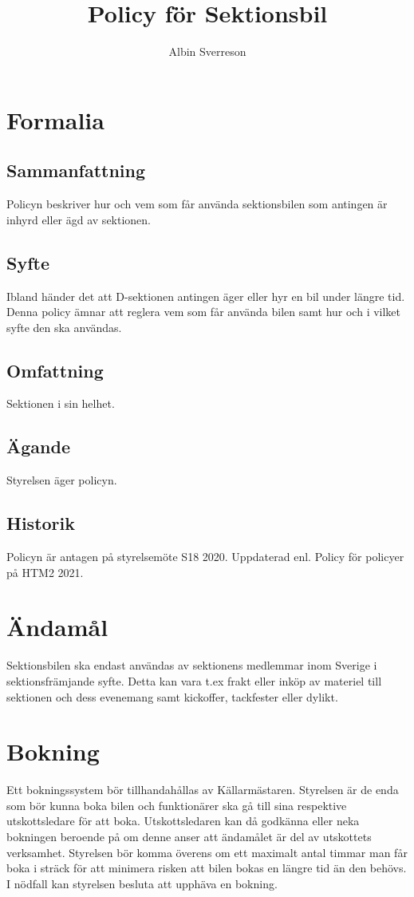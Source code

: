 \documentclass{dsekprotokoll}
\author{Albin Sverreson}
\title{Policy för Sektionsbil}
\begin{document}
\maketitle
\section{Formalia}
\subsection{Sammanfattning}
Policyn beskriver hur och vem som får använda sektionsbilen som antingen är inhyrd eller ägd av sektionen.
\subsection{Syfte}
Ibland händer det att D-sektionen antingen äger eller hyr en bil under längre tid. Denna policy ämnar att reglera vem som får använda bilen samt hur och i vilket syfte den ska användas.
\subsection{Omfattning}
Sektionen i sin helhet.
\subsection{Ägande}
Styrelsen äger policyn.
\subsection{Historik}
Policyn är antagen på styrelsemöte S18 2020.
Uppdaterad enl. Policy för policyer på HTM2 2021.


\section{Ändamål}
Sektionsbilen ska endast användas av sektionens medlemmar inom Sverige i sektionsfrämjande syfte. Detta kan vara t.ex frakt eller inköp av materiel till sektionen och dess evenemang samt kickoffer, tackfester eller dylikt.
\section{Bokning}
Ett bokningssystem bör tillhandahållas av Källarmästaren. Styrelsen är de enda som bör kunna boka bilen och funktionärer ska gå till sina respektive utskottsledare för att boka. Utskottsledaren kan då godkänna eller neka bokningen beroende på om denne anser att ändamålet är del av utskottets verksamhet. Styrelsen bör komma överens om ett maximalt antal timmar man får boka i sträck för att minimera risken att bilen bokas en längre tid än den behövs. I nödfall kan styrelsen besluta att upphäva en bokning.
\end{document}
